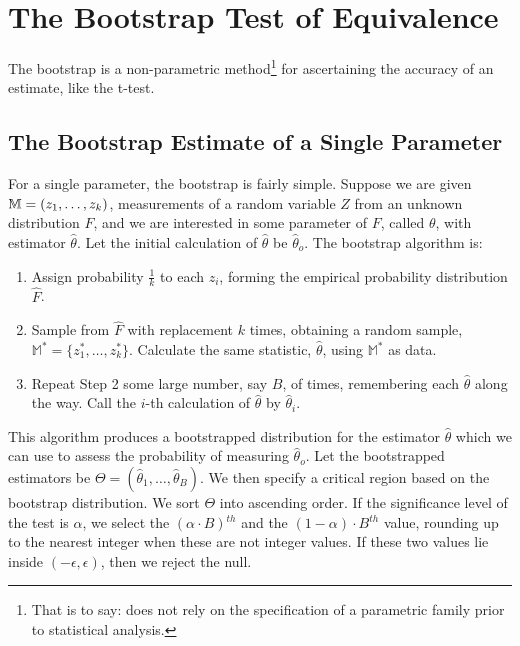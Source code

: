  \section{The Bootstrap Test of Equivalence}
 \label{Bootstrap}
 
 The bootstrap is a non-parametric method\footnote{That is to say: does not rely on the specification of a parametric family prior to statistical analysis.} for ascertaining the accuracy of an estimate, like the t-test. 
 
 \subsection{The Bootstrap Estimate of a Single Parameter}
 For a single parameter, the bootstrap is fairly simple. Suppose we are given  \newline $\mathbb{M} = \nolinebreak ( z_1 , \dots, z_k )$, measurements of a random variable $Z$ from an unknown distribution $F$, and we are interested in some parameter of $F$, called $\theta$, with estimator $\hat{\theta}$. Let the initial calculation of $\hat{\theta}$ be $\hat{\theta}_o$. The bootstrap algorithm is:
 \begin{enumerate}
 
 
 \item Assign probability $\frac{1}{k}$ to each $z_i$, forming the empirical probability distribution $\hat{F}$. 
 
 \item Sample from $\hat{F}$ with replacement $k$ times, obtaining a random sample, $\mathbb{M^*} =  \{z_1^* , \dots, z_k^* \} $. Calculate the same statistic, $\hat{\theta}$, using $\mathbb{M^*}$ as data. 
 
 \item Repeat Step 2  some large number, say $B$, of times, remembering each $\hat{\theta}$ along the way. Call the $i$-th calculation of $\hat{\theta}$ by $\hat{\theta}_i$.
  

 \end{enumerate}
 
This algorithm produces a bootstrapped distribution for the estimator $\hat{\theta}$ which we can use to assess the probability of measuring $\hat{\theta}_o$. Let the bootstrapped estimators be $\Theta = ( \hat{\theta}_1, \dots, \hat{\theta}_B )$. We then specify a critical region based on the bootstrap distribution. We sort $\Theta$ into ascending order. If the significance level of the test is $\alpha$, we select the $(\alpha \cdot B)$$^{th}$ and the $(1 - \alpha) \cdot B$$^{th}$ value, rounding up to the nearest integer when these are not integer values. If these two values lie inside $(-\epsilon, \epsilon)$, then we reject the null.

